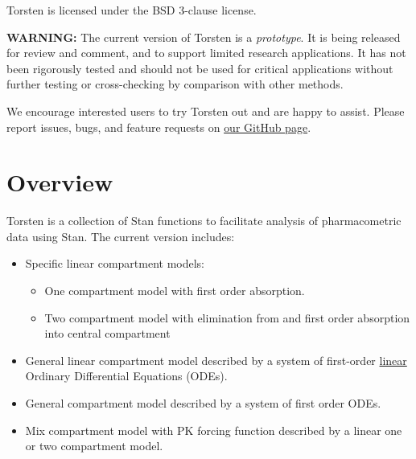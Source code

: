 \documentclass[11pt, reqno]{amsbook}
\numberwithin{section}{chapter}
\theoremstyle{remark}
\begin{document}
Torsten is licensed under the BSD 3-clause license.

\begin{mdframed}
\textbf{WARNING:} The current version of Torsten is a \emph{prototype}. It
is being released for review and comment, and to support limited
research applications. It has not been rigorously tested and should
not be used for critical applications without further testing or
cross-checking by comparison with other methods.

We encourage interested users to try Torsten out and are happy to
assist. Please report issues, bugs, and feature requests on
\href{https://github.com/metrumresearchgroup/stan}{our GitHub page}.
\end{mdframed}

\section{Overview}
\label{sec:org195bc0f}
Torsten is a collection of Stan functions to facilitate analysis of
pharmacometric data using Stan. The current version
includes:
\begin{itemize}
\item Specific linear compartment models:
\begin{itemize}
\item One compartment model with first order absorption.
\item Two compartment model with elimination from and first order absorption into central compartment
\end{itemize}
\item General linear compartment model described by a system of first-order \underline{linear} Ordinary Differential Equations (ODEs).
\item General compartment model described by a system of first order ODEs.
\item Mix compartment model with PK forcing function described by a linear one or two compartment model.
\end{itemize}
\end{document}
